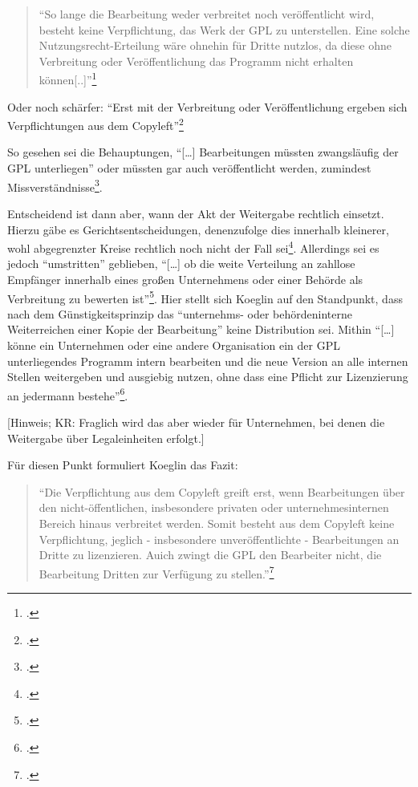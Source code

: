 \documentclass[DIV=calc,BCOR=5mm,11pt,headings=small,oneside,abstract=true, toc=bib]{scrartcl}
\begin{document}
\begin{quote}\enquote{So lange die Bearbeitung weder verbreitet noch
veröffentlicht wird, besteht keine Verpflichtung, das Werk der GPL zu
unterstellen. Eine solche Nutzungsrecht-Erteilung wäre ohnehin für Dritte
nutzlos, da diese ohne Verbreitung oder Veröffentlichung das Programm nicht
erhalten können[..]}\footcite[][209]{Koglin2007a}
\end{quote}

Oder noch schärfer: \enquote{Erst mit der Verbreitung oder Veröffentlichung
ergeben sich Verpflichtungen aus dem
Copyleft}\footcite[][211]{Koglin2007a}

So gesehen sei die Behauptungen, \enquote{[\ldots] Bearbeitungen müssten
zwangsläufig der GPL unterliegen} oder müssten gar auch veröffentlicht
werden, zumindest Missverständnisse\footcite[][209]{Koglin2007a}.

Entscheidend ist dann aber, wann der Akt der Weitergabe rechtlich einsetzt.
Hierzu gäbe es Gerichtsentscheidungen, denenzufolge dies innerhalb kleinerer,
wohl abgegrenzter Kreise rechtlich noch nicht der Fall
sei\footcite[vgl.][211]{Koglin2007a}. Allerdings sei es jedoch
\enquote{umstritten} geblieben, \enquote{[\ldots] ob die weite
Verteilung an zahllose Empfänger innerhalb eines großen Unternehmens oder
einer Behörde als Verbreitung zu bewerten
ist}\footcite[vgl.][211]{Koglin2007a}. Hier stellt sich Koeglin auf den
Standpunkt, dass nach dem Günstigkeitsprinzip das \enquote{unternehms- oder
behördeninterne Weiterreichen einer Kopie der Bearbeitung} keine
Distribution sei. Mithin \enquote{[\ldots] könne ein Unternehmen oder eine
andere Organisation ein der GPL unterliegendes Programm intern bearbeiten
und die neue Version an alle internen Stellen weitergeben und ausgiebig
nutzen, ohne dass eine Pflicht zur Lizenzierung an jedermann
bestehe}\footcite[vgl.][212]{Koglin2007a}.

[Hinweis; KR: Fraglich wird das aber wieder für Unternehmen, bei denen die
Weitergabe über Legaleinheiten erfolgt.]

Für diesen Punkt formuliert Koeglin das Fazit:

\begin{quote}\enquote{Die Verpflichtung aus dem Copyleft greift erst, wenn
Bearbeitungen über den nicht-öffentlichen, insbesondere privaten oder
unternehmesinternen Bereich hinaus verbreitet werden. Somit besteht aus dem
Copyleft keine Verpflichtung, jeglich - insbesondere unveröffentlichte -
Bearbeitungen an Dritte zu lizenzieren. Auich zwingt die GPL den Bearbeiter
nicht, die Bearbeitung Dritten zur Verfügung zu
stellen.}\footcite[vgl.][2227]{Koglin2007a}
\end{quote}
\end{document}

